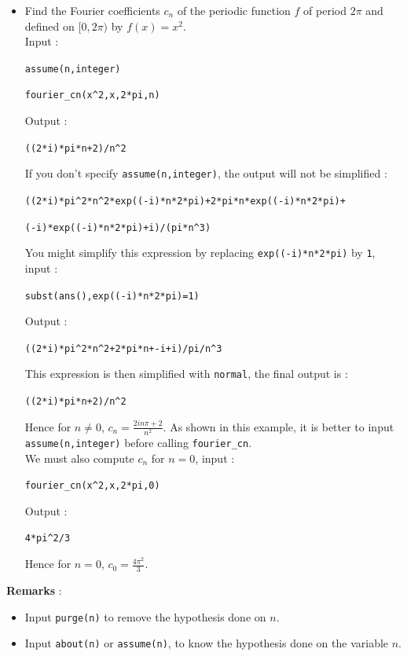\documentclass[a4paper,11pt]{book}
\begin{document}
\begin{itemize}
\item Find the Fourier coefficients $c_n$ of the periodic function $f$ of 
period $2\pi$ and  defined on $[0,2\pi)$ by $ f(x)=x^2$.\\ 
Input  :
\begin{center}{\tt assume(n,integer)}\end{center}
\begin{center}{\tt fourier\_cn(x\verb|^|2,x,2*pi,n)}\end{center}
Output :
\begin{center}{\tt ((2*i)*pi*n+2)/n\verb|^|2}\end{center}
If you don't specify {\tt assume(n,integer)}, the output will not be 
simplified :
\begin{center}{\tt ((2*i)*pi\verb|^|2*n\verb|^|2*exp((-i)*n*2*pi)+2*pi*n*exp((-i)*n*2*pi)+}\end{center}
\begin{center}{\tt (-i)*exp((-i)*n*2*pi)+i)/(pi*n\verb|^|3)}\end{center}
You might simplify this expression by replacing 
{\tt exp((-i)*n*2*pi)} by {\tt 1}, input :
\begin{center}{\tt subst(ans(),exp((-i)*n*2*pi)=1)}\end{center}
Output :
\begin{center}{\tt ((2*i)*pi\verb|^|2*n\verb|^|2+2*pi*n+-i+i)/pi/n\verb|^|3}\end{center}
This expression is then simplified with {\tt normal}, the final
output is :
\begin{center}{\tt ((2*i)*pi*n+2)/n\verb|^|2}\end{center}
Hence for $n \neq 0$, $\displaystyle c_n=\frac{2in\pi+2}{n^2}$.
As shown in this example, it is better to input  {\tt
  assume(n,integer)} before calling {\tt fourier\_cn}.\\
We must also compute $c_n$ for $n=0$, input :
\begin{center}{\tt fourier\_cn(x\verb|^|2,x,2*pi,0)}\end{center}
Output :
\begin{center}{\tt  4*pi\verb|^|2/3}\end{center}
Hence for  $n= 0$, $\displaystyle c_0=\frac{4{\pi}^2}{3}$. 
\end{itemize}
{\bf Remarks} :
\begin{itemize}
\item Input {\tt purge(n)} to remove the hypothesis done
  on $n$.
\item
Input {\tt about(n)} or {\tt assume(n)}, to know 
the hypothesis done on the variable $n$.
\end{itemize}
\end{document}
